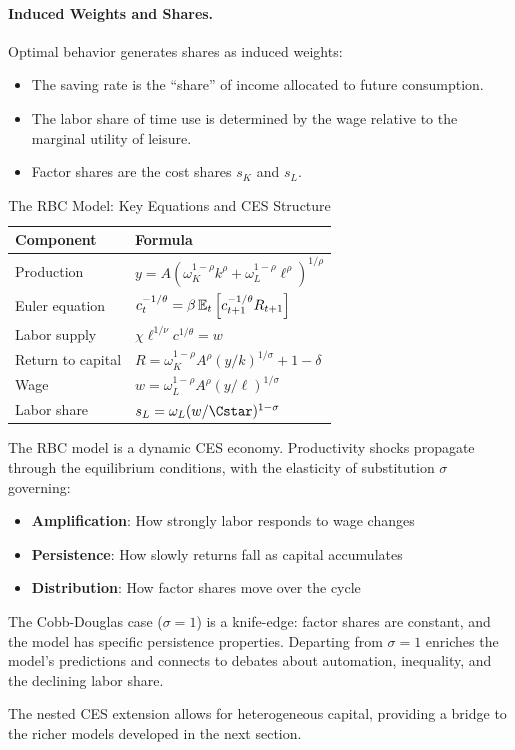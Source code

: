 \paragraph{Induced Weights and Shares.}
Optimal behavior generates shares as induced weights:
\begin{itemize}[nosep]
\item The saving rate is the ``share'' of income allocated to future consumption.
\item The labor share of time use is determined by the wage relative to the marginal utility of leisure.
\item Factor shares are the cost shares $s_K$ and $s_L$.
\end{itemize}

\begin{table}[H]
\centering
\caption{The RBC Model: Key Equations and CES Structure}
\label{tab:rbc-summary}
\renewcommand{\arraystretch}{1.6}
\begin{tabular}{@{}ll@{}}
\toprule
\textbf{Component} & \textbf{Formula} \\
\midrule
Production & $y = A \left( \omega_K^{1-\rho} k^\rho + \omega_L^{1-\rho} \ell^\rho \right)^{1/\rho}$ \\[6pt]
Euler equation & $c_t^{-1/\theta} = \beta \, \mathbb{E}_t \left[ c_{t+1}^{-1/\theta} R_{t+1} \right]$ \\[6pt]
Labor supply & $\chi \ell^{1/\nu} c^{1/\theta} = w$ \\[6pt]
Return to capital & $R = \omega_K^{1-\rho} A^\rho (y/k)^{1/\sigma} + 1 - \delta$ \\[6pt]
Wage & $w = \omega_L^{1-\rho} A^\rho (y/\ell)^{1/\sigma}$ \\[6pt]
Labor share & $s_L = \omega_L (w/\Cstar)^{1-\sigma}$ \\[6pt]
\bottomrule
\end{tabular}
\end{table}

\begin{callouttip}
The RBC model is a dynamic CES economy. Productivity shocks propagate through the equilibrium conditions, with the elasticity of substitution $\sigma$ governing:
\begin{itemize}[nosep]
\item \textbf{Amplification}: How strongly labor responds to wage changes
\item \textbf{Persistence}: How slowly returns fall as capital accumulates
\item \textbf{Distribution}: How factor shares move over the cycle
\end{itemize}
The Cobb-Douglas case ($\sigma = 1$) is a knife-edge: factor shares are constant, and the model has specific persistence properties. Departing from $\sigma = 1$ enriches the model's predictions and connects to debates about automation, inequality, and the declining labor share.

The nested CES extension allows for heterogeneous capital, providing a bridge to the richer models developed in the next section.
\end{callouttip}

